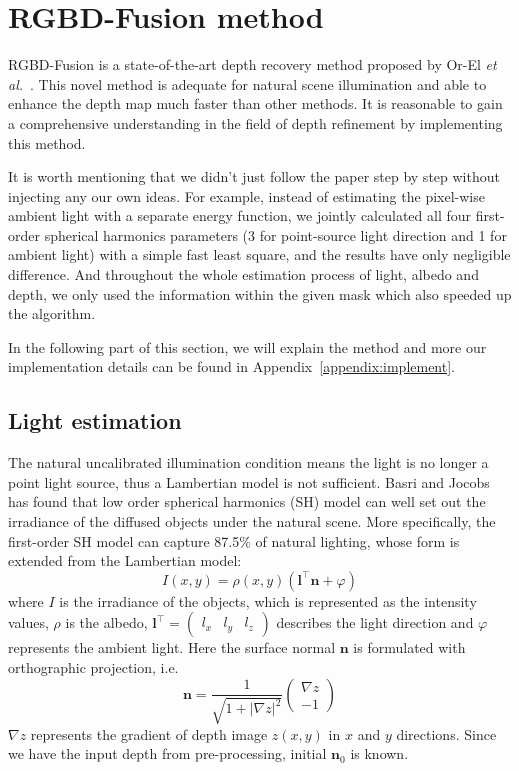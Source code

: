 \section{RGBD-Fusion method}
RGBD-Fusion is a state-of-the-art depth recovery method proposed by Or-El \emph{et al.}~\cite{or2015rgbd}.
This novel method is adequate for natural scene illumination and able to enhance the depth map much faster than other methods.
It is reasonable to gain a comprehensive understanding in the field of depth refinement by implementing this method.

It is worth mentioning that we didn't just follow the paper step by step without injecting any our own ideas.
For example, instead of estimating the pixel-wise ambient light with a separate energy function, we jointly calculated all four first-order spherical harmonics parameters (3 for point-source light direction and 1 for ambient light) with a simple fast least square, and the results have only negligible difference.
And throughout the whole estimation process of light, albedo and depth, we only used the information within the given mask which also speeded up the algorithm.

In the following part of this section, we will explain the method and more our implementation details can be found in Appendix~\ref{appendix:implement}.

\subsection{Light estimation}
The natural uncalibrated illumination condition means the light is no longer a point light source, thus a Lambertian model is not sufficient. 
Basri and Jocobs~\cite{basri2003lambertian} has found that low order spherical harmonics (SH) model can well set out the irradiance of the diffused objects under the natural scene.
More specifically, the first-order SH model can capture 87.5\% of natural lighting, whose form is extended from the Lambertian model:
\begin{equation}\label{eq:rgbd_light_model}
I(x,y) = \rho(x,y)(\mathbf{l}^\top \mathbf{n} + \varphi)
\end{equation}
where $I$ is the irradiance of the objects, which is represented as the intensity values, $\rho$ is the albedo, $\mathbf{l}^\top = \begin{pmatrix} l_x & l_y & l_z \end{pmatrix}$ describes the light direction and $\varphi$ represents the ambient light.
Here the surface normal $\mathbf{n}$ is formulated with orthographic projection, i.e. 
\begin{equation}
	\mathbf{n} = \frac{1}{\sqrt{1 + |\nabla z|^2}}
	\begin{pmatrix} 
		 \nabla z\\ 
		 -1
	 \end{pmatrix}
\end{equation}
$\nabla z$ represents the gradient of depth image $z(x,y)$ in $x$ and $y$ directions.
Since we have the input depth from pre-processing, initial $\mathbf{n}_0$ is known.

